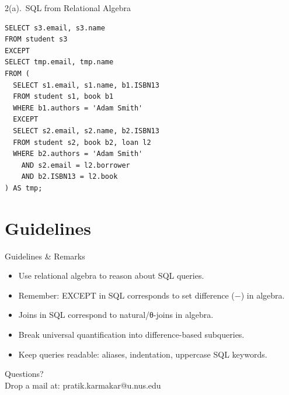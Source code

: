 \documentclass{beamer}
\begin{document}
\begin{frame}[fragile]{2(a).\ SQL from Relational Algebra}
\begin{lstlisting}
SELECT s3.email, s3.name
FROM student s3
EXCEPT
SELECT tmp.email, tmp.name
FROM (
  SELECT s1.email, s1.name, b1.ISBN13
  FROM student s1, book b1
  WHERE b1.authors = 'Adam Smith'
  EXCEPT
  SELECT s2.email, s2.name, b2.ISBN13
  FROM student s2, book b2, loan l2
  WHERE b2.authors = 'Adam Smith'
    AND s2.email = l2.borrower
    AND b2.ISBN13 = l2.book
) AS tmp;
\end{lstlisting}
\end{frame}

\section{Guidelines}
\begin{frame}{Guidelines \& Remarks}
\small
\begin{itemize}\itemsep4pt
  \item Use relational algebra to reason about SQL queries.
  \item Remember: EXCEPT in SQL corresponds to set difference (−) in algebra.
  \item Joins in SQL correspond to natural/θ-joins in algebra.
  \item Break universal quantification into difference-based subqueries.
  \item Keep queries readable: aliases, indentation, uppercase SQL keywords.
\end{itemize}
\end{frame}

\begin{frame}
\begin{center}
Questions?\\
Drop a mail at: pratik.karmakar@u.nus.edu
\end{center}
\end{frame}
\end{document}
